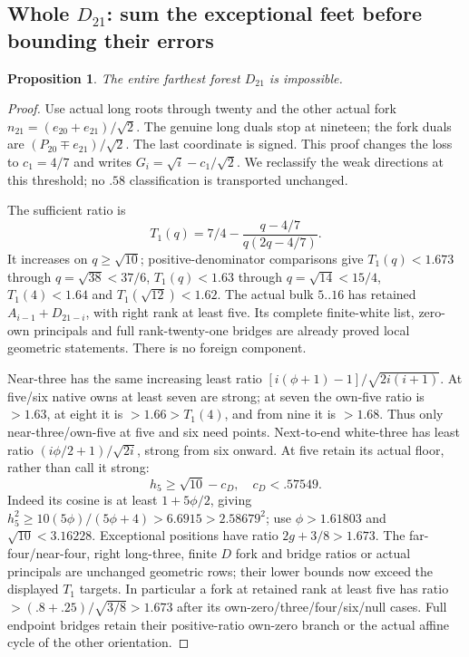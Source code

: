 \documentclass[11pt]{article}
\newtheorem{proposition}[theorem]{Proposition}
\theoremstyle{definition}
\theoremstyle{remark}
\begin{document}
\subsection[Whole D21: sum the exceptional feet before bounding their errors]{Whole $D_{21}$: sum the exceptional feet before bounding their errors}
\label{app:tail:wholeD21}
\begin{proposition}
\label{app:tail:prop:wholeD21}
The entire farthest forest $D_{21}$ is impossible.
\end{proposition}
\begin{proof}
Use actual long roots through twenty and the other actual fork
$n_{21}=(e_{20}+e_{21})/\sqrt2$. The genuine long duals stop at
nineteen; the fork duals are $(P_{20}\mathbin\mp e_{21})/\sqrt2$.
The last coordinate is signed. This proof changes the loss to
$c_1=4/7$ and writes $G_i=\sqrt i-c_1/\sqrt2$.
We reclassify the weak directions at this threshold; no $.58$
classification is transported unchanged.

The sufficient ratio is
\[
 T_1(q)=7/4-{\frac{q-4/7}{ q(2q-4/7)}}.
\]
It increases on $q\ge\sqrt{10}$; positive-denominator comparisons
give $T_1(q)<1.673$ through $q=\sqrt{38}<37/6$,
$T_1(q)<1.63$ through $q=\sqrt{14}<15/4$,
$T_1(4)<1.64$ and $T_1(\sqrt{12})<1.62$.
The actual bulk $5..16$ has retained $A_{i-1}+D_{21-i}$, with
right rank at least five. Its complete finite-white list, zero-own
principals and full rank-twenty-one bridges are already proved
local geometric statements. There is no foreign component.

Near-three has the same increasing least ratio
$[i(\phi+1)-1]/\sqrt{2i(i+1)}$. At five/six native owns at least
seven are strong; at seven the own-five ratio is $>1.63$, at
eight it is $>1.66>T_1(4)$, and from nine it is $>1.68$.
Thus only near-three/own-five at five and six need points.
Next-to-end white-three has least ratio $(i\phi/2+1)/\sqrt{2i}$,
strong from six onward. At five retain its actual floor, rather
than call it strong:
\[
 h_5\ge\sqrt{10}-c_D,\quad c_D<.57549.
\]
Indeed its cosine is at least $1+5\phi/2$, giving
$h_5^2\ge10(5\phi)/(5\phi+4)>6.6915>2.58679^2$;
use $\phi>1.61803$ and $\sqrt{10}<3.16228$.
Exceptional positions have ratio $2g+3/8>1.673$.
The far-four/near-four, right long-three, finite $D$ fork and
bridge ratios or actual principals are unchanged geometric rows;
their lower bounds now exceed the displayed $T_1$ targets. In
particular a fork at retained rank at least five has ratio
$>(.8+.25)/\sqrt{3/8}>1.673$ after its own-zero/three/four/six/null
cases. Full endpoint bridges retain their positive-ratio own-zero
branch or the actual affine cycle of the other orientation.


\end{proof}
\end{document}
